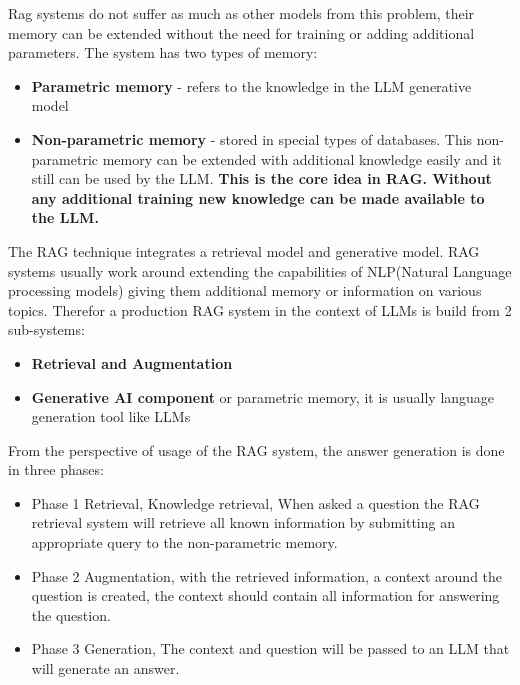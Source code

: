 \documentclass{wseas}
\begin{document}
Rag systems do not suffer as much as other models from this problem,
their memory can be extended without the need for training or adding
additional parameters. The system has two types of memory:

\begin{itemize}

\item
  \textbf{Parametric memory} - refers to the knowledge in the LLM
  generative model
\item
  \textbf{Non-parametric memory} - stored in special types of databases.
  This non-parametric memory can be extended with additional knowledge
  easily and it still can be used by the LLM. \textbf{This is the core
  idea in RAG. Without any additional training new knowledge can be made
  available to the LLM.}
\end{itemize}

The RAG technique integrates a retrieval model and generative model. RAG
systems usually work around extending the capabilities of NLP(Natural
Language processing models) giving them additional memory or information
on various topics. Therefor a production RAG system in the context of
LLMs is build from 2 sub-systems:

\begin{itemize}

\item
  \textbf{Retrieval and Augmentation}
\item
  \textbf{Generative AI component} or parametric memory, it is usually
  language generation tool like LLMs
\end{itemize}

From the perspective of usage of the RAG system, the answer generation is
done in three phases:

\begin{itemize}

\item
  Phase 1 Retrieval, Knowledge retrieval, When asked a question the RAG
  retrieval system will retrieve all known information by submitting an
  appropriate query to the non-parametric memory.
\item
  Phase 2 Augmentation, with the retrieved information, a context around
  the question is created, the context should contain all information
  for answering the question.
\item
  Phase 3 Generation, The context and question will be passed to an LLM
  that will generate an answer.
\end{itemize}
\end{document}
